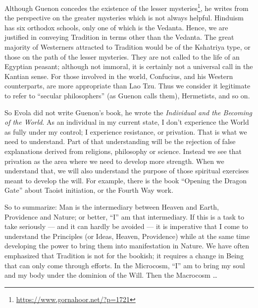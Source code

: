 Although Guenon concedes the existence of the lesser mysteries\footnote{\url{https://www.gornahoor.net/?p=1721}}, he writes from the perspective on the greater mysteries which is not always helpful. Hinduism has six orthodox schools, only one of which is the Vedanta. Hence, we are justified in conveying Tradition in terms other than the Vedanta. The great majority of Westerners attracted to Tradition would be of the Kshatriya type, or those on the path of the lesser mysteries. They are not called to the life of an Egyptian peasant; although not immoral, it is certainly not a universal call in the Kantian sense. For those involved in the world, Confucius, and his Western counterparts, are more appropriate than Lao Tzu. Thus we consider it legitimate to refer to “secular philosophers” (as Guenon calls them), Hermetists, and so on.

So Evola did not write Guenon's book, he wrote the \emph{Individual and the Becoming of the World}. As an individual in my current state, I don't experience the World as fully under my control; I experience resistance, or privation. That is what we need to understand. Part of that understanding will be the rejection of false explanations derived from religions, philosophy or science. Instead we see that privation as the area where we need to develop more strength. When we understand that, we will also understand the purpose of those spiritual exercises meant to develop the will. For example, there is the book “Opening the Dragon Gate” about Taoist initiation, or the Fourth Way work.

So to summarize: Man is the intermediary between Heaven and Earth, Providence and Nature; or better, “I” am that intermediary. If this is a task to take seriously — and it can hardly be avoided — it is imperative that I come to understand the Principles (or Ideas, Heaven, Providence) while at the same time developing the power to bring them into manifestation in Nature. We have often emphasized that Tradition is not for the bookish; it requires a change in Being that can only come through efforts. In the Microcosm, “I” am to bring my soul and my body under the dominion of the Will. Then the Macrocosm …



